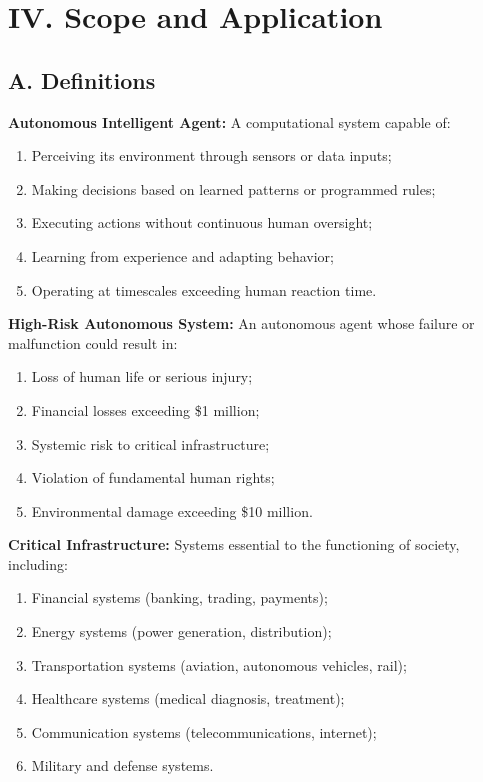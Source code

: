 \vspace{0.5cm}

\section*{IV. Scope and Application}

\subsection*{A. Definitions}

\textbf{Autonomous Intelligent Agent:} A computational system capable of:
\begin{enumerate}[leftmargin=1.5cm]
    \item Perceiving its environment through sensors or data inputs;
    \item Making decisions based on learned patterns or programmed rules;
    \item Executing actions without continuous human oversight;
    \item Learning from experience and adapting behavior;
    \item Operating at timescales exceeding human reaction time.
\end{enumerate}

\textbf{High-Risk Autonomous System:} An autonomous agent whose failure or malfunction could result in:
\begin{enumerate}[leftmargin=1.5cm]
    \item Loss of human life or serious injury;
    \item Financial losses exceeding \$1 million;
    \item Systemic risk to critical infrastructure;
    \item Violation of fundamental human rights;
    \item Environmental damage exceeding \$10 million.
\end{enumerate}

\textbf{Critical Infrastructure:} Systems essential to the functioning of society, including:
\begin{enumerate}[leftmargin=1.5cm]
    \item Financial systems (banking, trading, payments);
    \item Energy systems (power generation, distribution);
    \item Transportation systems (aviation, autonomous vehicles, rail);
    \item Healthcare systems (medical diagnosis, treatment);
    \item Communication systems (telecommunications, internet);
    \item Military and defense systems.
\end{enumerate}

